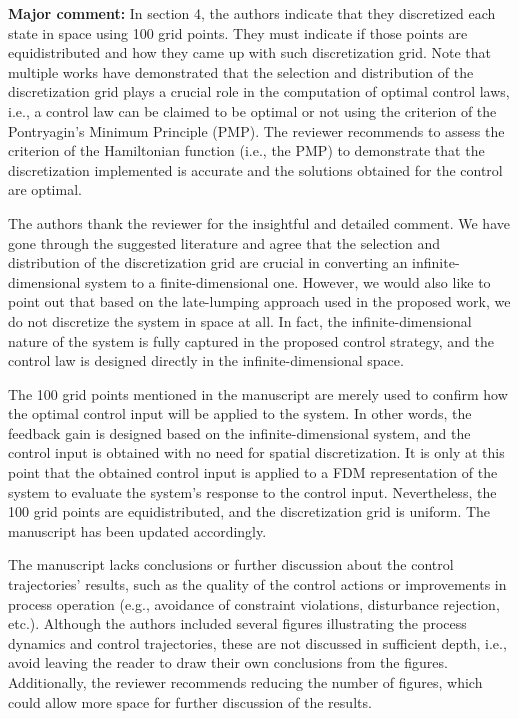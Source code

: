 \documentclass[11pt,answers]{exam}
\begin{document}
\begin{questions}

    \question \textbf{Major comment: } In section 4, the authors indicate that they discretized each state in space using 100 grid points. They must indicate if those points are equidistributed and how they came up with such discretization grid. Note that multiple works \cite{palma2023selection, assassa2016optimality, chen2014bilevel} have demonstrated that the selection and distribution of the discretization grid plays a crucial role in the computation of optimal control laws, i.e., a control law can be claimed to be optimal or not using the criterion of the Pontryagin's Minimum Principle (PMP). The reviewer recommends to assess the criterion of the Hamiltonian function (i.e., the PMP) to demonstrate that the discretization implemented is accurate and the solutions obtained for the control are optimal.

    \begin{solutionorbox} \label{comment:3_1}
        The authors thank the reviewer for the insightful and detailed comment. We have gone through the suggested literature and agree that the selection and distribution of the discretization grid are crucial in converting an infinite-dimensional system to a finite-dimensional one. However, we would also like to point out that based on the late-lumping approach used in the proposed work, we do not discretize the system in space at all. In fact, the infinite-dimensional nature of the system is fully captured in the proposed control strategy, and the control law is designed directly in the infinite-dimensional space.

        The 100 grid points mentioned in the manuscript are merely used to confirm how the optimal control input will be applied to the system. In other words, the feedback gain is designed based on the infinite-dimensional system, and the control input is obtained with no need for spatial discretization. It is only at this point that the obtained control input is applied to a FDM representation of the system to evaluate the system's response to the control input. Nevertheless, the 100 grid points are equidistributed, and the discretization grid is uniform. The manuscript has been updated accordingly.
    \end{solutionorbox}


    \question The manuscript lacks conclusions or further discussion about the control trajectories' results, such as the quality of the control actions or improvements in process operation (e.g., avoidance of constraint violations, disturbance rejection, etc.). Although the authors included several figures illustrating the process dynamics and control trajectories, these are not discussed in sufficient depth, i.e., avoid leaving the reader to draw their own conclusions from the figures. Additionally, the reviewer recommends reducing the number of figures, which could allow more space for further discussion of the results.


\end{questions}
\end{document}

